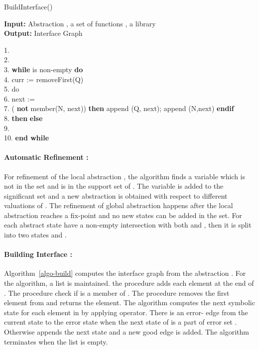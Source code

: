 \documentclass{llncs}
\begin{document}
\begin{algorithm}[htb]
\caption{BuildInterface()} \label{algo-build}
{\bf Input:} Abstraction , a set of functions , a library  \\
 {\bf Output:} Interface Graph 
 \vspace*{-1ex}
\begin{tabbing}
1.  \= \\
2.  \>  \\
3.  \> {\bf while}  is non-empty {\bf do}\\
4.  \> \quad curr := removeFirst(Q)\\
5.  \>   do \\
6.  \> \quad \quad next :=  \\
7.  \> \quad {} ( {\bf not} member(N, next)) {\bf then} append (Q, next); append (N,next) {\bf endif}\\
8.  \> \quad {}  {\bf then}  {\bf else}  \\   
9. \>  \\
10. \>  {\bf end while}\\  
\end{tabbing}
\vspace*{-3ex}
\end{algorithm}
\paragraph{Automatic Refinement :} 
For refinement of the local abstraction , the algorithm finds a variable  which is not 
in the set  and is in the support set of  .
The variable is added to the significant set  and a new abstraction  is obtained
with respect to different valuations of .
The refinement of global abstraction  happens after the local abstraction reaches a fix-point
and no new states can be added in the  set. 
For each abstract state  have a non-empty intersection with both 
 and , then it is split into two states  and .


\paragraph{Building Interface :} Algorithm~\ref{algo-build} computes the interface graph from the abstraction .
For the algorithm, a list  is maintained.  
the procedure  adds each element  at the end of .
The procedure  check if  is a member of .
The procedure  removes the first element from  and returns the element.
The algorithm computes the next symbolic state for each element in  by applying  operator. 
There is an error- edge from the current state 
 to the error state  when the next state of  is a part of error set .
Otherwise appends the next state  and a new good edge  is added.
The algorithm terminates when the list  is empty.
\end{document}
